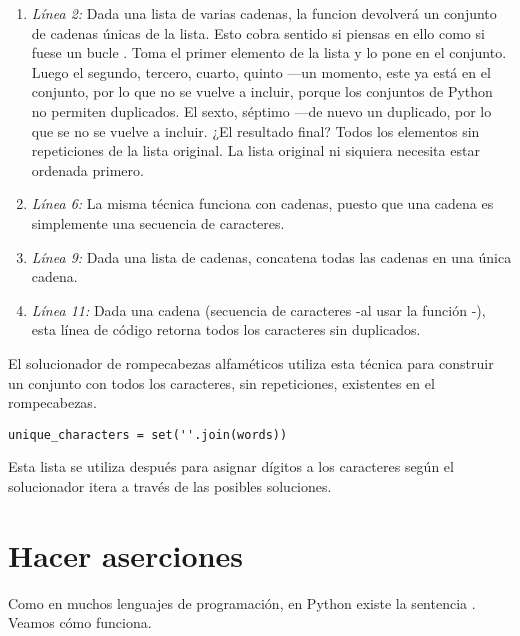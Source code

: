 \begin{enumerate}

\item \emph{Línea 2:} Dada una lista de varias cadenas, la funcion  devolverá un conjunto de cadenas únicas de la lista. Esto cobra sentido si piensas en ello como si fuese un bucle . Toma el primer elemento de la lista y lo pone en el conjunto. Luego el segundo, tercero, cuarto, quinto ---un momento, este ya está en el conjunto, por lo que no se vuelve a incluir, porque los conjuntos de Python no permiten duplicados. El sexto, séptimo ---de nuevo un duplicado, por lo que se no se vuelve a incluir. ¿El resultado final? Todos los elementos sin repeticiones de la lista original. La lista original ni siquiera necesita estar ordenada primero.

\item \emph{Línea 6:} La misma técnica funciona con cadenas, puesto que una cadena es simplemente una secuencia de caracteres.

\item \emph{Línea 9:} Dada una lista de cadenas,  concatena todas las cadenas en una única cadena.

\item \emph{Línea 11:} Dada una cadena (secuencia de caracteres -al usar la función -), esta línea de código retorna todos los caracteres sin duplicados.

\end{enumerate}

El solucionador de rompecabezas alfaméticos utiliza esta técnica para construir un conjunto con todos los caracteres, sin repeticiones, existentes en el rompecabezas.

\noindent\begin{minipage}{\textwidth}
\begin{lstlisting}[mathescape=True]
unique_characters = set(''.join(words))
\end{lstlisting}
\end{minipage}

Esta lista se utiliza después para asignar dígitos a los caracteres según el solucionador itera a través de las posibles soluciones.

\section{Hacer aserciones}

Como en muchos lenguajes de programación, en Python existe la sentencia . Veamos cómo funciona.

